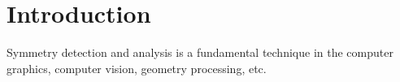 \section{Introduction}
\label{sec:intro}

Symmetry detection and analysis is a fundamental technique in the computer graphics, computer vision, geometry processing, etc.